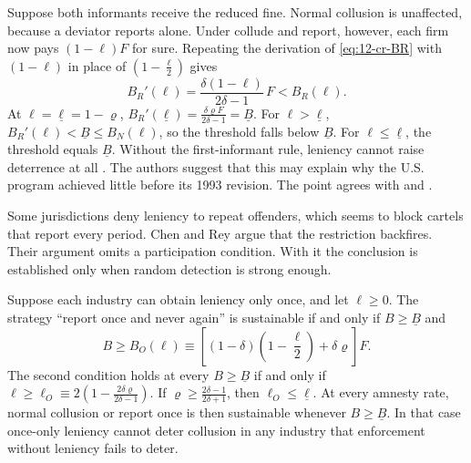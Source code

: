 \begin{remark}\label{rem:12-first-informant}
Suppose both informants receive the reduced fine. Normal collusion is unaffected, because a deviator reports alone.
Under collude and report, however, each firm now pays $(1-\ell)F$ for sure. Repeating the derivation of
\eqref{eq:12-cr-BR} with $(1-\ell)$ in place of $(1 - \frac{\ell}{2})$ gives
\begin{equation}\label{eq:12-cr-BRprime}
B_R'(\ell) = \frac{\delta(1-\ell)}{2\delta - 1}\,F < B_R(\ell).
\end{equation}
At $\ell = \underline\ell = 1 - \varrho$, $B_R'(\underline\ell) = \frac{\delta\varrho F}{2\delta-1} = \underline B$.
For $\ell > \underline\ell$, $B_R'(\ell) < \underline B \le B_N(\ell)$, so the threshold falls below $\underline B$.
For $\ell \le \underline\ell$, the threshold equals $\underline B$. Without the first-informant rule, leniency cannot
raise deterrence at all \citep[pp.~13--14]{ChenRey2013}. The authors suggest that this may explain why the U.S. program
achieved little before its 1993 revision. The point agrees with \citet{Spagnolo2004} and \citet{Harrington2008}.
\end{remark}

Some jurisdictions deny leniency to repeat offenders, which seems to block cartels that report every period. Chen and
Rey argue that the restriction backfires. Their argument omits a participation condition. With it the conclusion is
established only when random detection is strong enough.

\begin{proposition}\label{prop:12-repeat-offenders}
Suppose each industry can obtain leniency only once, and let $\ell \ge 0$. The strategy ``report once and never
again'' is sustainable if and only if $B \ge \underline B$ and
\begin{equation}\label{eq:12-cr-BO}
B \ge B_O(\ell) \equiv \left[(1-\delta)\left(1 - \frac{\ell}{2}\right) + \delta\varrho\right]F .
\end{equation}
The second condition holds at every $B \ge \underline B$ if and only if
$\ell \ge \ell_O \equiv 2\left(1 - \frac{2\delta\varrho}{2\delta - 1}\right)$. If
$\varrho \ge \frac{2\delta - 1}{2\delta + 1}$, then $\ell_O \le \underline\ell$. At every amnesty rate, normal
collusion or report once is then sustainable whenever $B \ge \underline B$. In that case once-only leniency cannot
deter collusion in any industry that enforcement without leniency fails to deter.
\end{proposition}

